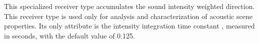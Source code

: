This specialized receiver type accumulates the sound intensity
weighted direction. This receiver type is used only for analysis and
characterization of acoustic scene properties. Its only attribute is
the intensity integration time constant , measured in
seconds, with the default value of 0.125.


